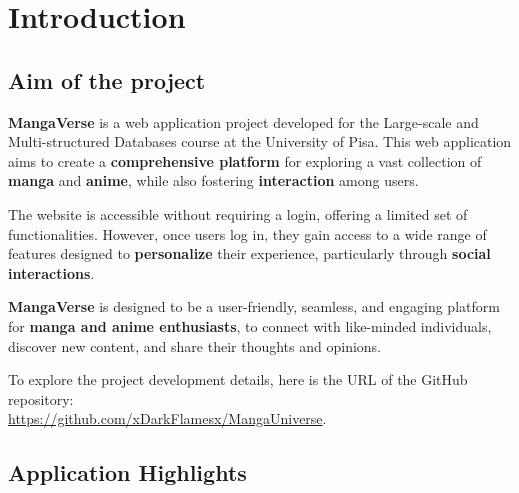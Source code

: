 \chapter{Introduction}

\section*{Aim of the project}

\textbf{MangaVerse} is a web application project developed for the Large-scale and 
Multi-structured Databases course at the University of Pisa. 
This web application aims to create a \textbf{comprehensive platform} for 
exploring a vast collection of \textbf{manga} and \textbf{anime}, while also fostering \textbf{interaction} among users.

\vspace{\baselineskip}

The website is accessible without requiring a login, offering a limited set of functionalities. 
However, once users log in, they gain access to a wide range of features designed to \textbf{personalize} 
their experience, particularly through \textbf{social interactions}.

\vspace{\baselineskip}

\textbf{MangaVerse} is designed to be a user-friendly, seamless, and engaging platform for \textbf{manga and anime enthusiasts}, 
to connect with like-minded individuals, discover new content, and share their thoughts and opinions.

\vspace{\baselineskip}

To explore the project development details, here is the URL of the GitHub repository:\\
\url{https://github.com/xDarkFlamesx/MangaUniverse}.

\section*{Application Highlights}


